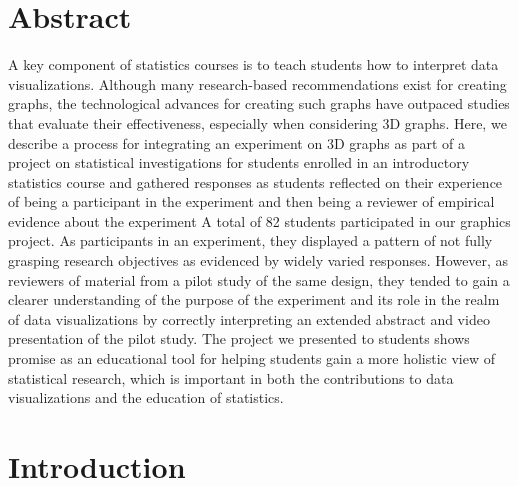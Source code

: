 \documentclass[
  12pt,
]{article}
\providecommand{\DIFdel}[1]{} %
\providecommand{\DIFadd}[1]{{\protect\color{blue} \sf #1}} %
\providecommand{\DIFdel}[1]{{\protect\color{red} [..\footnote{removed: #1} ]}} %
\providecommand{\DIFaddbegin}{} %
\providecommand{\DIFaddend}{} %
\providecommand{\DIFdelbegin}{} %
\providecommand{\DIFdelend}{} %
\newcommand{\DIFscaledelfig}{0.5}
\newlength{\DIFdelgraphicswidth} %
\newlength{\DIFdelgraphicsheight} %
\newcommand{\DIFaddincludegraphics}[2][]{{\color{blue}\fbox{\DIFOincludegraphics[#1]{#2}}}} %
\newcommand{\DIFdelincludegraphics}[2][]{%
\sbox{\DIFdelgraphicsbox}{\DIFOincludegraphics[#1]{#2}}%
\settoboxwidth{\DIFdelgraphicswidth}{\DIFdelgraphicsbox} %
\settoboxtotalheight{\DIFdelgraphicsheight}{\DIFdelgraphicsbox} %
\scalebox{\DIFscaledelfig}{%
\parbox[b]{\DIFdelgraphicswidth}{\usebox{\DIFdelgraphicsbox}\\[-\baselineskip] \rule{\DIFdelgraphicswidth}{0em}}\llap{\resizebox{\DIFdelgraphicswidth}{\DIFdelgraphicsheight}{%
\setlength{\unitlength}{\DIFdelgraphicswidth}%
\begin{picture}(1,1)%
\thicklines\linethickness{2pt} %
{\color[rgb]{1,0,0}\put(0,0){\framebox(1,1){}}}%
{\color[rgb]{1,0,0}\put(0,0){\line( 1,1){1}}}%
{\color[rgb]{1,0,0}\put(0,1){\line(1,-1){1}}}%
\end{picture}%
}\hspace*{3pt}}} %
} %
\DeclareRobustCommand{\DIFaddbegin}{\DIFOaddbegin \let\includegraphics\DIFaddincludegraphics} %
\DeclareRobustCommand{\DIFaddend}{\DIFOaddend \let\includegraphics\DIFOincludegraphics} %
\DeclareRobustCommand{\DIFdelbegin}{\DIFOdelbegin \let\includegraphics\DIFdelincludegraphics} %
\DeclareRobustCommand{\DIFdelend}{\DIFOaddend \let\includegraphics\DIFOincludegraphics} %
\begin{document}
\section{Abstract}\label{abstract}

A key component of statistics courses is to teach students how to
interpret data visualizations. Although many research-based
recommendations exist for creating graphs, the technological advances
for creating such graphs have outpaced studies that evaluate their
effectiveness, especially when considering 3D graphs. Here, we describe
a process for integrating an experiment on 3D graphs as part of a
project on statistical investigations for students enrolled in an
introductory statistics course and gathered responses as students
reflected on their experience of being a participant in the experiment
and then being a reviewer of empirical evidence about the experiment A
total of 82 students participated in our graphics project. As
participants in an experiment, they displayed a pattern of not fully
grasping research objectives as \DIFdelbegin \DIFdel{evidence }\DIFdelend \DIFaddbegin \DIFadd{evidenced }\DIFaddend by widely varied responses.
However, as reviewers of material from a pilot study of the same design,
they tended to gain a clearer understanding \DIFdelbegin \DIFdel{about }\DIFdelend \DIFaddbegin \DIFadd{of }\DIFaddend the purpose of the
experiment and its role in the realm of data visualizations by correctly
interpreting an extended abstract and video presentation of the pilot
study. The project we presented to students shows promise as an
educational tool for helping students gain a more holistic view of
statistical research, which is important in both the contributions to
data visualizations and the education of statistics.

\section{Introduction}\label{introduction}
\end{document}
